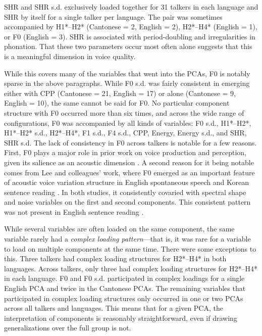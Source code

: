 SHR and SHR s.d. exclusively loaded together for 31 talkers in each language and SHR by itself for a single talker per language. The pair was sometimes accompanied by H1*--H2* (Cantonese = 2, English = 2), H2*--H4* (English = 1), or F0 (English = 3). SHR is associated with period-doubling and irregularities in phonation. That these two parameters occur most often alone suggests that this is a meaningful dimension in voice quality.

While this covers many of the variables that went into the PCAs, F0 is notably sparse in the above paragraphs. While F0 s.d. was fairly consistent in emerging either with CPP (Cantonese = 21, English = 17) or alone (Cantonese = 9, English = 10), the same cannot be said for F0. No particular component structure with F0 occurred more than six times, and across the wide range of configurations, F0 was accompanied by all kinds of variables: F0 s.d., H1*--H2*, H1*--H2* s.d., H2*--H4*, F1 s.d., F4 s.d., CPP, Energy, Energy s.d., and SHR, SHR s.d. The lack of consistency in F0 across talkers is notable for a few reasons. First, F0 plays a major role in prior work on voice production and perception, given its salience as an acoustic dimension \citep{perrachione_2019_judgments}. A second reason for it being notable comes from Lee and colleagues' work, where F0 emerged as an important feature of acoustic voice variation structure in English spontaneous speech \citep{lee_2019_spontaneous} and Korean sentence reading \citep{lee_2020_language}. In both studies, it consistently covaried with spectral shape and noise variables on the first and second components. This consistent pattern was not present in English sentence reading \citep{lee_2019_acoustic}.

While several variables are often loaded on the same component, the same variable rarely had a \textit{complex loading pattern}---that is, it was rare for a variable to load on multiple components at the same time. There were some exceptions to this. Three talkers had complex loading structures for H2*--H4* in both languages. Across talkers, only three had complex loading structures for H2*--H4* in each language. F0 and F0 s.d. participated in complex loadings for a single English PCA and twice in the Cantonese PCAs. The remaining variables that participated in complex loading structures only occurred in one or two PCAs across all talkers and languages. This means that for a given PCA, the interpretation of components is reasonably straightforward, even if drawing generalizations over the full group is not. 

